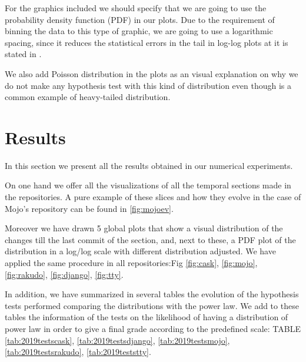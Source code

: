 \documentclass[conference]{IEEEtran}
\begin{document}
For the graphics included we should specify that we are going to use
the probability density function (PDF) in our plots. Due to the
requirement of binning the data to this type of graphic, we are going
to use a logarithmic spacing, since it reduces the statistical errors
in the tail in log-log plots at it is stated in
\cite{newman2005power}.

We also add Poisson distribution in the plots as an visual explanation
on why we do not make any hypothesis test with this kind of
distribution even though is a common example of heavy-tailed
distribution.





\section{Results}
\label{res}
In this section we present all the results obtained in our numerical
experiments.

On one hand we offer all the visualizations of all the temporal
sections made in the repositories. A pure example of these slices and how they evolve in the case of Mojo's repository can be found
in \ref{fig:mojoev}.

Moreover we have drawn 5 global plots that show  a visual distribution of the changes till the last commit of the section, and, next to these, a PDF plot of the distribution in a log/log scale with different
distribution adjusted. We have applied the same procedure in all repositories:Fig \ref{fig:cask}, \ref{fig:mojo}, \ref{fig:rakudo}, \ref{fig:django}, \ref{fig:tty}.

In addition, we have summarized in several tables the evolution of the
hypothesis tests performed comparing the distributions with the power
law. We add to these tables the information of the tests on the
likelihood of having a distribution of power law in order to give a
final grade according to the predefined scale: TABLE \ref{tab:2019testscask}, \ref{tab:2019testsdjango}, \ref{tab:2019testsmojo}, \ref{tab:2019testsrakudo}, \ref{tab:2019teststty}.
\end{document}
